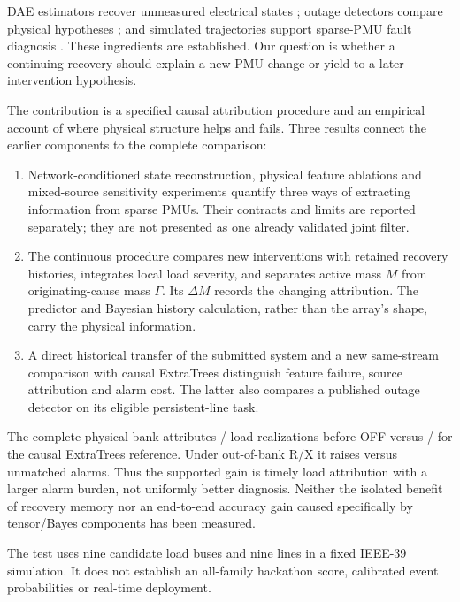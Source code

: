 DAE estimators recover unmeasured electrical states
\cite{katanic2024recursive}; outage detectors compare physical hypotheses
\cite{chen2016quickest,rovatsos2017outage}; and simulated trajectories
support sparse-PMU fault diagnosis \cite{warner2023highfidelity}. These
ingredients are established. Our question is whether a continuing recovery
should explain a new PMU change or yield to a later intervention hypothesis.

The contribution is a specified causal attribution procedure and an
empirical account of where physical structure helps and fails. Three
results connect the earlier components to the complete comparison:
\begin{enumerate}
\item Network-conditioned state reconstruction, physical feature ablations
and mixed-source sensitivity experiments quantify three ways of extracting
information from sparse PMUs. Their contracts and limits are reported
separately; they are not presented as one already validated joint filter.
\item The continuous procedure compares new interventions with retained
recovery histories, integrates local load severity, and separates active
mass $M$ from originating-cause mass $\Gamma$. Its $\Delta M$ records the
changing attribution. The predictor and Bayesian history calculation,
rather than the array's shape, carry the physical information.
\item A direct historical transfer of the submitted system and a new
same-stream comparison with causal ExtraTrees distinguish feature failure,
source attribution and alarm cost. The latter also compares a published
outage detector on its eligible persistent-line task.
\end{enumerate}
The complete physical bank attributes
\ReaderPhysicalLoad{}/\ReaderFamilyTotal{} load realizations before OFF
versus \ReaderETLoad{}/\ReaderFamilyTotal{} for the causal ExtraTrees
reference. Under out-of-bank R/X it raises \ReaderPhysicalOutsideExtras{}
versus \ReaderETOutsideExtras{} unmatched alarms. Thus the supported gain
is timely load attribution with a larger alarm burden, not uniformly
better diagnosis. Neither the isolated benefit of recovery memory nor an
end-to-end accuracy gain caused specifically by tensor/Bayes components
has been measured.

The test uses nine candidate load buses and nine lines in a fixed IEEE-39
simulation. It does not establish an all-family hackathon score, calibrated
event probabilities or real-time deployment.
